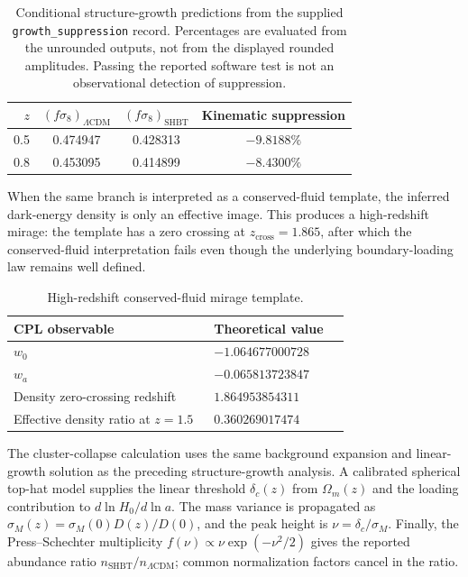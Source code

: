 \documentclass[11pt,letterpaper]{article}
\theoremstyle{plain}
\DeclareRobustCommand{\pyvar}[1]{%
  \ifmmode\text{\nolinkurl{#1}}\else\nolinkurl{#1}\fi%
}
\newcommand{\lcdm}{\ensuremath{\Lambda\mathrm{CDM}}}
\begin{document}
\begin{table}[htbp]
\centering
\small
\begin{tabular}{@{}rccc@{}}
\toprule
\(z\) & \((f\sigma_8)_{\lcdm}\) & \((f\sigma_8)_{\text{SHBT}}\) & Kinematic suppression \\
\midrule
0.5 & 0.474947 & 0.428313 & \(-9.8188\%\) \\
0.8 & 0.453095 & 0.414899 & \(-8.4300\%\) \\
\bottomrule
\end{tabular}
\caption{Conditional structure-growth predictions from the supplied
\pyvar{growth_suppression} record.  Percentages are evaluated from the
unrounded outputs, not from the displayed rounded amplitudes.  Passing the
reported software test is not an observational detection of suppression.}
\label{tab:growth-suppression-audit}
\end{table}

When the same branch is interpreted as a conserved-fluid template, the inferred
dark-energy density is only an effective image.  This produces a high-redshift
mirage: the template has a zero crossing at
\(z_{\text{cross}}=1.865\), after which the conserved-fluid interpretation fails
even though the underlying boundary-loading law remains well defined.

\begin{table}[htbp]
\centering
\small
\begin{tabular}{@{}L{0.46\linewidth}L{0.28\linewidth}@{}}
\toprule
CPL observable & Theoretical value \\
\midrule
\(w_0\) & \(-1.064677000728\) \\
\(w_a\) & \(-0.065813723847\) \\
Density zero-crossing redshift & \(1.864953854311\) \\
Effective density ratio at \(z=1.5\) & \(0.360269017474\) \\
\bottomrule
\end{tabular}
\caption{High-redshift conserved-fluid mirage template.}
\label{tab:mirage-forecast-audit}
\end{table}

The cluster-collapse calculation uses the same background expansion and
linear-growth solution as the preceding structure-growth analysis.  A calibrated
spherical top-hat model supplies the linear threshold \(\delta_c(z)\) from
\(\Omega_m(z)\) and the loading contribution to
\(d\ln H_0/d\ln a\).  The mass variance is propagated as
\(\sigma_M(z)=\sigma_M(0)D(z)/D(0)\), and the peak height is
\(\nu=\delta_c/\sigma_M\).  Finally, the Press--Schechter multiplicity
\(f(\nu)\propto\nu\exp(-\nu^2/2)\) gives the reported abundance ratio
\(n_{\text{SHBT}}/n_{\lcdm}\); common normalization factors cancel in the ratio.
\end{document}
